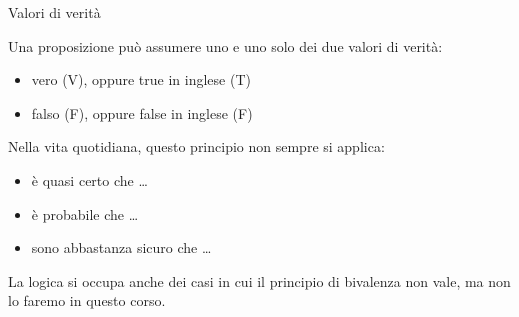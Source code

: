 \documentclass[aspectratio=169,10pt,dvipsnames,handout]{beamer}
\begin{document}
\begin{frame}{Valori di verità}
	\begin{definition}
		Una proposizione può assumere uno e uno solo dei due \alert{valori di verità}:
		\begin{itemize}
			\item vero (\alert{V}), oppure true in inglese (\alert{T})
			\item falso (\alert{F}), oppure false in inglese (\alert{F})
		\end{itemize}
	\end{definition}
	Nella vita quotidiana, questo principio non sempre si applica:
	\begin{itemize}
		\item è quasi certo che \ldots
		\item è probabile che \ldots
		\item sono abbastanza sicuro che \ldots
	\end{itemize}
	La logica si occupa anche dei casi in cui il principio di bivalenza non vale, ma non lo faremo in questo corso.
\end{frame}

%
%
%
\end{document}
